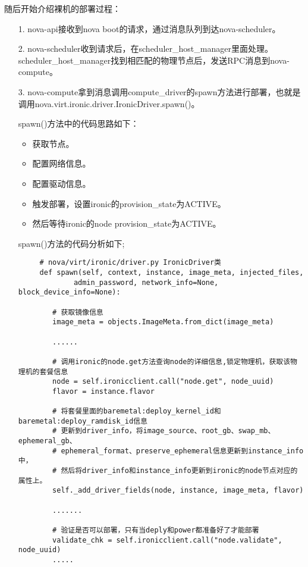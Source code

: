 \documentclass[a4paper,left=2.5cm,right=2.5cm,11pt]{article}
\begin{document}
	随后开始介绍裸机的部署过程：
	\begin{itemize}
		\item[1.] nova-api接收到nova boot的请求，通过消息队列到达nova-scheduler。
		\item[2.] nova-scheduler收到请求后，在scheduler\_host\_manager里面处理。
				  scheduler\_host\_manager找到相匹配的物理节点后，发送RPC消息到nova-compute。
		\item[3.] nova-compute拿到消息调用compute\_driver的spawn方法进行部署，也就是调用nova.virt.ironic.driver.IronicDriver.spawn()。\par

		spawn()方法中的代码思路如下：
		\begin{itemize}
			\item 获取节点。
			\item 配置网络信息。
			\item 配置驱动信息。
			\item 触发部署，设置ironic的provision\_state为ACTIVE。
			\item 然后等待ironic的node provision\_state为ACTIVE。
		\end{itemize}

		spawn()方法的代码分析如下;
		\begin{lstlisting}
	 # nova/virt/ironic/driver.py IronicDriver类
	 def spawn(self, context, instance, image_meta, injected_files,  
             admin_password, network_info=None, block_device_info=None):  

        # 获取镜像信息
        image_meta = objects.ImageMeta.from_dict(image_meta)

        ......

        # 调用ironic的node.get方法查询node的详细信息,锁定物理机，获取该物理机的套餐信息
        node = self.ironicclient.call("node.get", node_uuid)
        flavor = instance.flavor

        # 将套餐里面的baremetal:deploy_kernel_id和baremetal:deploy_ramdisk_id信息
        # 更新到driver_info，将image_source、root_gb、swap_mb、ephemeral_gb、
        # ephemeral_format、preserve_ephemeral信息更新到instance_info中，
        # 然后将driver_info和instance_info更新到ironic的node节点对应的属性上。
        self._add_driver_fields(node, instance, image_meta, flavor)

        .......

        # 验证是否可以部署，只有当deply和power都准备好了才能部署
        validate_chk = self.ironicclient.call("node.validate", node_uuid)
        .....


\end{lstlisting}
\end{itemize}
\end{document}
